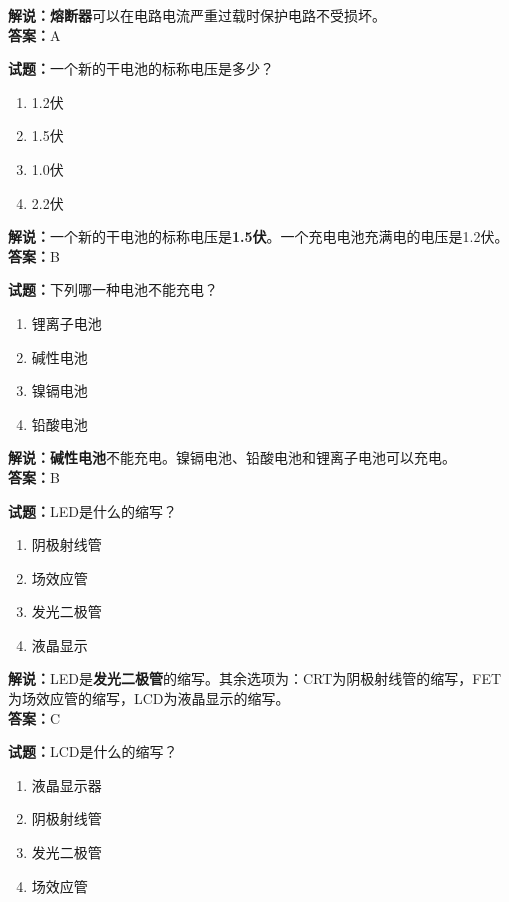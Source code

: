 \documentclass{ctexbook}
\begin{document}
\noindent\textbf{解说：熔断器}可以在电路电流严重过载时保护电路不受损坏。\\\noindent\textbf{答案：}A
\bigskip


\noindent\textbf{试题：}一个新的干电池的标称电压是多少？

\begin{enumerate}[leftmargin=3em]
	\item 1.2伏
	\item 1.5伏
	\item 1.0伏
	\item 2.2伏
\end{enumerate}

\noindent\textbf{解说：}一个新的干电池的标称电压是\textbf{1.5伏}。一个充电电池充满电的电压是1.2伏。\\\noindent\textbf{答案：}B

\bigskip


\noindent\textbf{试题：}下列哪一种电池不能充电？

\begin{enumerate}[leftmargin=3em]
	\item 锂离子电池
	\item 碱性电池
	\item 镍镉电池
	\item 铅酸电池
\end{enumerate}

\noindent\textbf{解说：碱性电池}不能充电。镍镉电池、铅酸电池和锂离子电池可以充电。\\\noindent\textbf{答案：}B
\bigskip


\noindent\textbf{试题：}LED是什么的缩写？

\begin{enumerate}[leftmargin=3em]
	\item 阴极射线管
	\item 场效应管
	\item 发光二极管
	\item 液晶显示
\end{enumerate}

\noindent\textbf{解说：}LED是\textbf{发光二极管}的缩写。其余选项为：CRT为阴极射线管的缩写，FET为场效应管的缩写，LCD为液晶显示的缩写。\\\noindent\textbf{答案：}C

\bigskip


\noindent\textbf{试题：}LCD是什么的缩写？

\begin{enumerate}[leftmargin=3em]
	\item 液晶显示器
	\item 阴极射线管
	\item 发光二极管
	\item 场效应管
\end{enumerate}
\end{document}
